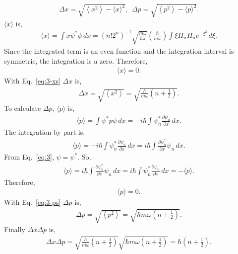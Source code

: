 \documentclass[floatfix,nofootinbib,superscriptaddress,fleqn]{revtex4-2}
\begin{document}
\begin{itemize}
  \begin{align*}
      \Delta x = \sqrt{\left\langle x^2\right\rangle 
      - {\langle x\rangle}^2  },\,\,\,
      \Delta p = \sqrt{\left\langle p^2\right\rangle 
      - {\langle p\rangle}^2  }.
  \end{align*}
  $\langle x\rangle$ is,
  \begin{align*}
      \langle x\rangle = \int x\psi^*\psi\,dx 
      = (n!2^n)^{-1}\sqrt{\frac{m\omega}{\hbar\pi}}
      \left(\frac{\hbar}{m\omega}\right)
      \int \xi H_nH_n e^{-\xi^2}\,d\xi.
  \end{align*}
  Since the integrated term is an even function and the integration 
  interval is symmetric,
  the integration is a zero. Therefore,
  \begin{align*}
    \langle x\rangle = 0.
  \end{align*}
  With Eq.~\eqref{eq:3-xs} $\Delta x$ is,
  \begin{align*}
    \Delta x = \sqrt{\left\langle x^2\right\rangle}
    = \sqrt{\frac{\hbar}{m\omega}
    \left( n+\frac{1}{2}\right)}.
  \end{align*}
  To calculate $\Delta p$,
  $\langle p\rangle$ is,
  \begin{align*}
    \langle p\rangle = \int \psi^*p\psi\,dx
    = -i\hbar\int\psi^*_n
    \frac{\partial \psi_n}{\partial x} \,dx.
  \end{align*}
  The integration by part is,
  \begin{align*}
      \langle p\rangle=-i\hbar\int\psi^*_n
      \frac{\partial \psi_n}{\partial x} \,dx
      =i\hbar\int\frac{\partial \psi^*_n}{\partial x}
      \psi_n \,dx.
  \end{align*}
  From Eq.~\eqref{eq:3}, $\psi = \psi^*$. So,
  \begin{align*}
    \langle p\rangle=i\hbar\int\frac{\partial \psi^*_n}{\partial x}
    \psi_n \,dx=i\hbar\int\psi^*_n
    \frac{\partial \psi_n}{\partial x}\,dx = -\langle p\rangle.
  \end{align*}
  Therefore,
  \begin{align*}
    \langle p\rangle = 0.
  \end{align*}
  With Eq.~\eqref{eq:3-ps} $\Delta p$ is,
  \begin{align*}
    \Delta p = \sqrt{\left\langle p^2\right\rangle}
    = \sqrt{\hbar m\omega\left( n+\frac{1}{2} \right)}.
  \end{align*}
  Finally $\Delta x\Delta p$ is,
  \begin{align}
    \Delta x\Delta p = \sqrt{\frac{\hbar}{m\omega}
    \left(n+\frac{1}{2}\right)}\sqrt{\hbar m\omega
    \left(n+\frac{1}{2}\right)}
    =\hbar\left(n+\frac{1}{2}\right).
  \end{align}
\end{itemize}
\end{document}
